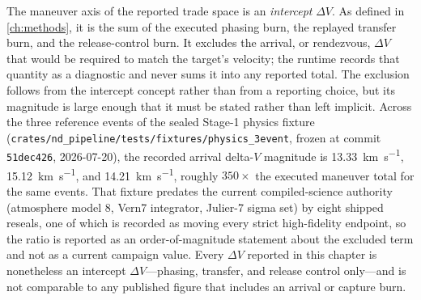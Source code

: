 The maneuver axis of the reported trade space is an \emph{intercept} \(\Delta V\). As defined in \cref{ch:methods}, it is the sum of the executed phasing burn, the replayed transfer burn, and the release-control burn. It excludes the arrival, or rendezvous, \(\Delta V\) that would be required to match the target's velocity; the runtime records that quantity as a diagnostic and never sums it into any reported total. The exclusion follows from the intercept concept rather than from a reporting choice, but its magnitude is large enough that it must be stated rather than left implicit. Across the three reference events of the sealed Stage-1 physics fixture (\texttt{crates/nd\_pipeline/tests/fixtures/physics\_3event}, frozen at commit \texttt{51dec426}, 2026-07-20), the recorded arrival delta-\(V\) magnitude is \SI{13.33}{\kilo\metre\per\second}, \SI{15.12}{\kilo\metre\per\second}, and \SI{14.21}{\kilo\metre\per\second}, roughly \(350\times\) the executed maneuver total for the same events. That fixture predates the current compiled-science authority (atmosphere model 8, Vern7 integrator, Julier-7 sigma set) by eight shipped reseals, one of which is recorded as moving every strict high-fidelity endpoint, so the ratio is reported as an order-of-magnitude statement about the excluded term and not as a current campaign value. Every \(\Delta V\) reported in this chapter is nonetheless an intercept \(\Delta V\)---phasing, transfer, and release control only---and is not comparable to any published figure that includes an arrival or capture burn.

